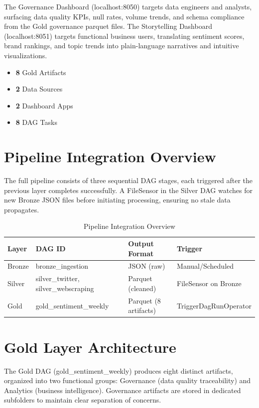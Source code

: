 \documentclass[12pt, a4paper]{article}
\begin{document}
The Governance Dashboard (localhost:8050) targets data engineers and analysts, surfacing data quality KPIs, null rates, volume trends, and schema compliance from the Gold governance parquet files. The Storytelling Dashboard (localhost:8051) targets functional business users, translating sentiment scores, brand rankings, and topic trends into plain-language narratives and intuitive visualizations.

\begin{itemize}
    \item \textbf{8} Gold Artifacts
    \item \textbf{2} Data Sources
    \item \textbf{2} Dashboard Apps
    \item \textbf{8} DAG Tasks
\end{itemize}

\section{Pipeline Integration Overview}
The full pipeline consists of three sequential DAG stages, each triggered after the previous layer completes successfully. A FileSensor in the Silver DAG watches for new Bronze JSON files before initiating processing, ensuring no stale data propagates.

\begin{table}[h]
\centering
\renewcommand{\arraystretch}{1.3}
\begin{tabularx}{\textwidth}{l X l X}
\toprule
\textbf{Layer} & \textbf{DAG ID} & \textbf{Output Format} & \textbf{Trigger} \\
\midrule
Bronze & bronze\_ingestion & JSON (raw) & Manual/Scheduled \\
Silver & silver\_twitter, silver\_webscraping & Parquet (cleaned) & FileSensor on Bronze \\
Gold & gold\_sentiment\_weekly & Parquet (8 artifacts) & TriggerDagRunOperator \\
\bottomrule
\end{tabularx}
\caption{Pipeline Integration Overview}
\end{table}

\section{Gold Layer Architecture}
The Gold DAG (gold\_sentiment\_weekly) produces eight distinct artifacts, organized into two functional groups: Governance (data quality traceability) and Analytics (business intelligence). Governance artifacts are stored in dedicated subfolders to maintain clear separation of concerns.
\end{document}
